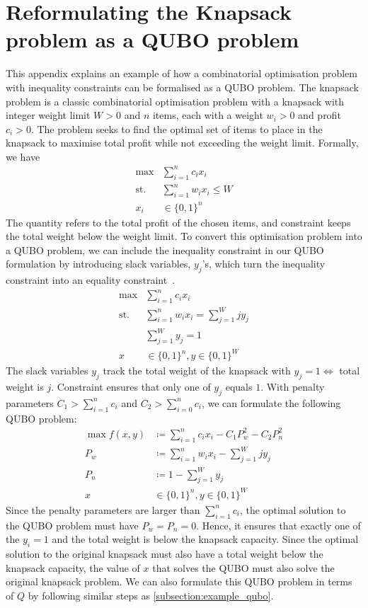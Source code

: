 \chapter{Reformulating the Knapsack problem as a QUBO problem}\label{appendix:knapsack}

This appendix explains an example of how a combinatorial optimisation problem with inequality constraints can be formalised as a QUBO problem. The knapsack problem is a classic combinatorial optimisation problem with a knapsack with integer weight limit $W > 0$ and $n$ items, each with a weight $w_i > 0$ and profit $c_i > 0$. The problem seeks to find the optimal set of items to place in the knapsack to maximise total profit while not exceeding the weight limit. Formally, we have
\begin{align}
\max &\sum_{i=1}^n c_i x_i \label{eq:knapsack_cost}\\
\mathrm{st.} &\sum_{i=1}^n w_i x_i \leq W \label{eq:knapsack_constraint}\\
x_i &\in \{0,1\}^n \nonumber
\end{align}
The quantity  refers to the total profit of the chosen items, and constraint  keeps the total weight below the weight limit. To convert this optimisation problem into a QUBO problem, we can include the inequality constraint in our QUBO formulation by introducing slack variables, $y_j$'s, which turn the inequality constraint into an equality constraint~\cite{b6}.
\begin{align}
\max &\sum_{i=1}^n c_i x_i \\
\mathrm{st.} &\sum_{i=1}^n w_i x_i = \sum_{j=1}^W jy_j \label{eq:knapsack_slack_weight}\\
&\sum_{j=1}^W y_j = 1 \label{eq:knapsack_slack_sum}\\
x &\in \{0,1\}^n, y \in \{0,1\}^W \nonumber
\end{align}
The slack variables $y_j$ track the total weight of the knapsack with $y_j = 1 \Leftrightarrow$ total weight is $j$. Constraint  ensures that only one of $y_j$ equals $1$. With penalty parameters $C_1 > \sum_{i=1}^n c_i$ and $C_2 > \sum_{i=0}^n c_i$, we can formulate the following QUBO problem:
\begin{align}
    \max f(x, y) &\coloneqq \sum_{i=1}^n c_i x_i - C_1 P_w^2 - C_2 P_n^2 \\
    P_w &\coloneqq \sum_{i=1}^n w_i x_i - \sum_{j=1}^W jy_j \\
    P_n &\coloneqq 1 - \sum_{j=1}^W y_j \\
    x &\in \{0,1\}^n, y \in \{0,1\}^W \nonumber
\end{align}
Since the penalty parameters are larger than $\sum_{i=1}^n c_i$, the optimal solution to the QUBO problem must have $P_w = P_n = 0$. Hence, it ensures that exactly one of the $y_i=1$ and the total weight is below the knapsack capacity. Since the optimal solution to the original knapsack must also have a total weight below the knapsack capacity, the value of $x$ that solves the QUBO must also solve the original knapsack problem. We can also formulate this QUBO problem in terms of $Q$ by following similar steps as \autoref{subsection:example_qubo}.